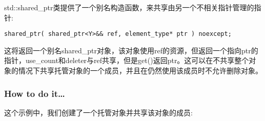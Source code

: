 
std::shared\_ptr类提供了一个别名构造函数，来共享由另一个不相关指针管理的指针:

\begin{lstlisting}[style=styleCXX]
shared_ptr( shared_ptr<Y>&& ref, element_type* ptr ) noexcept;
\end{lstlisting}

这将返回一个别名shared\_ptr对象，该对象使用ref的资源，但返回一个指向ptr的指针，use\_count和deleter与ref共享，但是get()返回ptr。这可以在不共享整个对象的情况下共享托管对象的一个成员，并且在仍然使用该成员时不允许删除对象。

\subsubsection{How to do it…}

这个示例中，我们创建了一个托管对象并共享该对象的成员:

